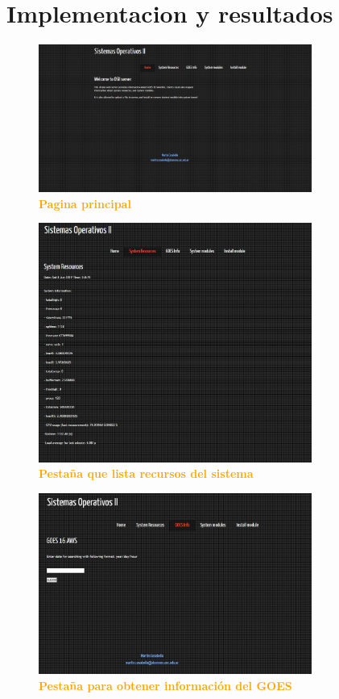 \documentclass{article}
\begin{document}
\section{Implementacion y resultados}
\begin{figure}[H]
    \centering
      \includegraphics[width=0.8\textwidth]{figures/1.jpg}
       \centering
       \caption{\textbf{\textcolor{Orange}{Pagina principal}}}
    \end{figure}

\begin{figure}[H]
    \centering
      \includegraphics[width=0.8\textwidth]{figures/2.jpg}
       \centering
       \caption{\textbf{\textcolor{Orange}{Pestaña que lista recursos del sistema}}}
    \end{figure}

\begin{figure}[H]
    \centering
      \includegraphics[width=0.8\textwidth]{figures/3.jpg}
       \centering
       \caption{\textbf{\textcolor{Orange}{Pestaña para obtener información del GOES}}}
    \end{figure}
\end{document}

